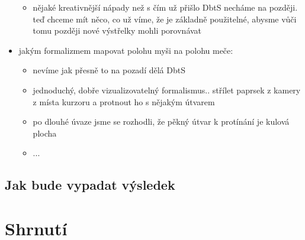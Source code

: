 \begin{itemize}
\begin{itemize}
            \item nějaké kreativnější nápady než s čím už přišlo DbtS necháme na později. teď chceme mít něco, co už víme, že je základně použitelné, abysme vůči tomu později nové výstřelky mohli porovnávat
        \end{itemize}
    \item jakým formalizmem mapovat polohu myši na polohu meče:
        \begin{itemize}
            \item nevíme jak přesně to na pozadí dělá DbtS
            \item  jednoduchý, dobře vizualizovatelný formalismus.. střílet paprsek z kamery z místa kurzoru a protnout ho s nějakým útvarem 
            \item  po dlouhé úvaze jsme se rozhodli, že pěkný útvar k protínání je kulová plocha
            \item  ...
        \end{itemize}
\end{itemize}


\subsection{Jak bude vypadat výsledek}


\section{Shrnutí}
